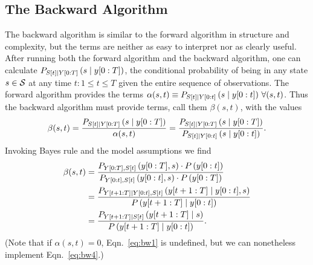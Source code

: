 \subsection{The Backward Algorithm}
\label{sec:backward}

The  backward algorithm is similar to the
forward algorithm in structure and complexity, but the terms are
neither as easy to interpret nor as clearly useful.  After running
both the forward algorithm and the backward algorithm, one can
calculate $P_{{S}{[t]}\mid Y[0:T]} \left(s\mid y[0:T] \right)$,
the conditional probability of being in any state $s \in \states$ at
any time $t: 1\leq t \leq T$ given the entire sequence of
observations.  The forward algorithm provides the terms $\alpha(s,t)
\equiv P_{{S}{[t]}\mid Y[0:t]} \left(s\mid y[0:t] \right)\,
\forall (s,t)$.  Thus the backward algorithm must provide terms, call
them $\beta(s,t)$, with the values
\begin{equation}
  \label{eq:bw1} \beta(s,t) =
  \frac{P_{{S}{[t]}\mid Y[0:T]} \left(s\mid y[0:T] \right)}
  {\alpha(s,t)} = \frac{P_{{S}{[t]}\mid Y[0:T]}
    \left(s\mid y[0:T] \right)}
  {P_{{S}{[t]}\mid Y[0:t]} \left(s\mid y[0:t] \right)}.
\end{equation}
Invoking Bayes rule and the model assumptions we find
\begin{align}
  \mlabel{eq:bw2} \beta(s,t) &= \frac{P_{\ts{Y}{0}{T},\ti{S}{t}}
    \left(\ts{y}{0}{T},s \right)\cdot P \left(\ts{y}{0}{t} \right)}
  {P_{\ts{Y}{0}{t},\ti{S}{t}}
    \left(\ts{y}{0}{t},s \right)\cdot P \left(\ts{y}{0}{T} \right)}\\
  \mlabel{eq:bw3} &= \frac{P_{\ts{Y}{t+1}{T}\given \ts{Y}{0}{t},\ti{S}{t}}
    \left(\ts{y}{t+1}{T}\given \ts{y}{0}{t},s \right)} {P
    \left(\ts{y}{t+1}{T}\given \ts{y}{0}{t} \right)}\\
  \label{eq:bw4}
  & = \frac{P_{\ts{Y}{t+1}{T}\given \ti{S}{t}} \left(\ts{y}{t+1}{T}\given s
    \right)} {P \left(\ts{y}{t+1}{T}\given \ts{y}{0}{t} \right)}.
\end{align}
(Note that if $\alpha(s,t)=0$, Eqn.~\eqref{eq:bw1} is undefined, but
we can nonetheless implement Eqn.~\eqref{eq:bw4}.)

